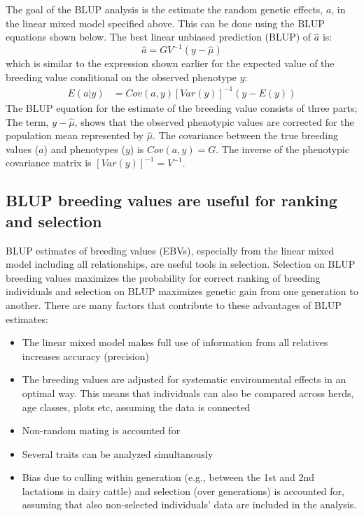 \documentclass[
]{article}
\providecommand{\tightlist}{%
  \setlength{\itemsep}{0pt}\setlength{\parskip}{0pt}}
\begin{document}
The goal of the BLUP analysis is the estimate the random genetic effects, \(a\), in the linear mixed model specified above. This can be done using the BLUP equations shown below. The best linear unbiased prediction (BLUP) of \(\hat{a}\) is:
\begin{equation}
\hat{a} = GV^{-1}(y - \hat{\mu})
\label{eq:hatublup}
\end{equation}
which is similar to the expression shown earlier for the expected value of the breeding value conditional on the observed phenotype \(y\):
\begin{align}
E(a|y) &= Cov(a,y)[Var(y)]^{-1}(y-E(y))
\end{align}
The BLUP equation for the estimate of the breeding value consists of three parts;
The term, \(y - \hat{\mu}\), shows that the observed phenotypic values are corrected for the population mean represented by \(\hat{\mu}\). The covariance between the true breeding values (\(a\)) and phenotypes (\(y\)) is \(Cov(a,y)=G\). The inverse of the phenotypic covariance matrix is \([Var(y)]^{-1}=V^{-1}\).

\subsection{BLUP breeding values are useful for ranking and selection}\label{blup-breeding-values-are-useful-for-ranking-and-selection}

BLUP estimates of breeding values (EBVs), especially from the linear mixed model including all relationships, are useful tools in selection. Selection on BLUP breeding values maximizes the
probability for correct ranking of breeding individuals and selection on BLUP maximizes genetic gain from one generation to another. There are many factors that
contribute to these advantages of BLUP estimates:

\begin{itemize}
\tightlist
\item
  The linear mixed model makes full use of information from all relatives increases accuracy (precision)
\item
  The breeding values are adjusted for systematic environmental effects in an optimal way. This means that individuals can also be compared across herds, age classes, plots etc, assuming the data is connected
\item
  Non-random mating is accounted for
\item
  Several traits can be analyzed simultanously
\item
  Bias due to culling within generation (e.g., between the 1st and 2nd lactations in dairy cattle) and selection (over generations) is accounted for, assuming that also non-selected individuals' data are included in the analysis.
\end{itemize}
\end{document}
